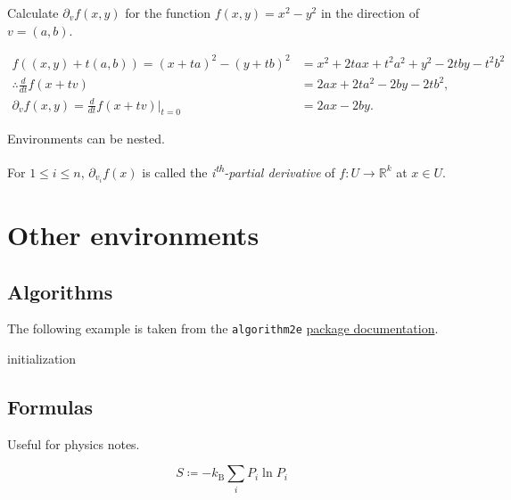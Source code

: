 \begin{example*}
	Calculate \(\partial_{v}f(x,y)\) for the function \(f(x,y)=x^{2}-y^{2}\) in the direction of \(v=(a,b)\).
	\begin{answer}[Solution]
		\begin{align*}
			f\left((x,y)+t(a,b)\right)=(x+ta)^{2}-(y+tb)^{2}    & =x^{2}+2tax+t^{2}a^{2}+y^{2}-2tby-t^{2}b^{2} \\
			\therefore \frac{d}{dt}f(x+tv)                      & =2ax+2ta^{2}-2by-2tb^{2},                    \\
			\partial_{v}f(x,y)= \frac{d}{dt}f(x+tv)\bigg|_{t=0} & =2ax-2by.
		\end{align*}
	\end{answer}
	\begin{note}
		Environments can be nested.
	\end{note}
\end{example*}

\begin{notation}
	For \(1\leq i\leq n\), \(\partial_{v_{i}}f(x)\) is called the \emph{i\textsuperscript{th}-partial derivative} of \(f:U\rightarrow \mathbb{R}^{k}\) at \(x \in U\).
\end{notation}

\section{Other environments}

\subsection{Algorithms}

The following example is taken from the \texttt{algorithm2e} \href{http://mirror.ctan.org/macros/latex/contrib/algorithm2e/doc/algorithm2e.pdf}{package documentation}.

\begin{algorithm}[title=Example]
	initialization\;
\end{algorithm}

\subsection{Formulas}

Useful for physics notes.

\begin{formula}[title=Gibb's entropy]
	\begin{equation}
		S \coloneq -k_{\mathrm{B}}\sum_{i}P_{i}\ln P_{i}
	\end{equation}
\end{formula}
